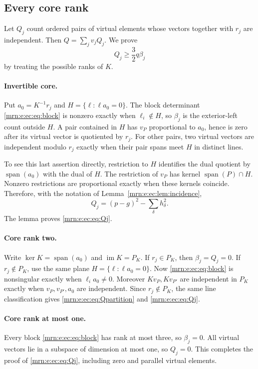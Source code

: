 \documentclass[11pt,a4paper]{article}
\theoremstyle{remark}\newtheorem{remark}[theorem]{Remark}
\newcommand{\spn}{\operatorname{span}}     %
\begin{document}
\subsection{Every core rank}
Let $Q_j$ count ordered pairs of virtual elements whose vectors together with $r_j$ are independent. Then $Q=\sum_jv_jQ_j$. We prove
\begin{equation}\label{mrn:e:ec:eq:Qj}
 Q_j\ge\frac32q\beta_j
\end{equation}
by treating the possible ranks of $K$.

\paragraph{Invertible core.}
Put $a_0=K^{-1}r_j$ and $H=\{\ell:\ell a_0=0\}$. The block determinant \eqref{mrn:e:ec:eq:block} is nonzero exactly when $\ell_i\notin H$, so $\beta_j$ is the exterior-left count outside $H$.
A pair contained in $H$ has $v_P$ proportional to $a_0$, hence is zero after its virtual vector is quotiented by $r_j$. For other pairs, two virtual vectors are independent modulo $r_j$ exactly when their pair spans meet $H$ in distinct lines.

To see this last assertion directly, restriction to $H$ identifies the dual quotient by $\spn(a_0)$ with the dual of $H$. The restriction of $v_P$ has kernel $\spn(P)\cap H$. Nonzero restrictions are proportional exactly when these kernels coincide. Therefore, with the notation of Lemma~\ref{mrn:e:ec:lem:incidence},
\begin{equation}\label{mrn:e:ec:eq:Qpartition}
 Q_j=(p-g)^2-\sum_\delta h_\delta^2.
\end{equation}
The lemma proves \eqref{mrn:e:ec:eq:Qj}.

\paragraph{Core rank two.}
Write $\ker K=\spn(a_0)$ and $\operatorname{im}K=P_K$. If $r_j\in P_K$, then $\beta_j=Q_j=0$. If $r_j\notin P_K$, use the same plane $H=\{\ell:\ell a_0=0\}$. Now \eqref{mrn:e:ec:eq:block} is nonsingular exactly when $\ell_i a_0\ne0$. Moreover $Kv_P,Kv_{P'}$ are independent in $P_K$ exactly when $v_P,v_{P'},a_0$ are independent. Since $r_j\notin P_K$, the same line classification gives \eqref{mrn:e:ec:eq:Qpartition} and \eqref{mrn:e:ec:eq:Qj}.

\paragraph{Core rank at most one.}
Every block \eqref{mrn:e:ec:eq:block} has rank at most three, so $\beta_j=0$. All virtual vectors lie in a subspace of dimension at most one, so $Q_j=0$. This completes the proof of \eqref{mrn:e:ec:eq:Qj}, including zero and parallel virtual elements.
\end{document}
